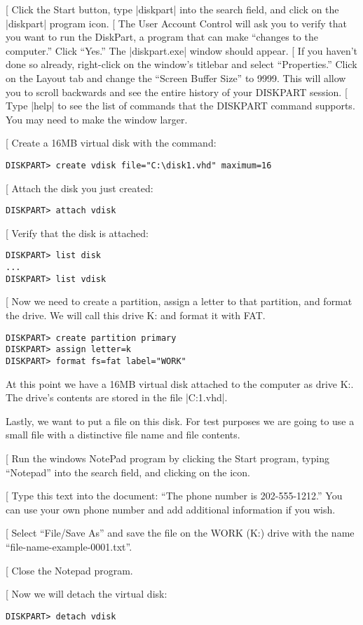 \documentclass[11pt,letter]{book}
\makeatletter
\def\step{%
   \@ifnextchar[ \@step{\@noitemargtrue\@step[\@itemlabel]}}
\def\@step[#1]{\item[#1]\mbox{}\hspace*{\dimexpr-\labelwidth-\labelsep}}
\makeatother
\begin{document}
\begin{steps}
\step Click the Start button, type |diskpart| into the search field,
and click on the |diskpart| program icon.
\step The User Account Control will ask you to verify that you want to
run the DiskPart, a program that can make ``changes to the computer.''
Click ``Yes.''  The |diskpart.exe| window should appear.
\step If you haven't done so already, right-click on the window's
titlebar and select ``Properties.'' Click on the Layout tab and change
the ``Screen Buffer Size'' to 9999. This will allow you to scroll
backwards and see the entire history of your DISKPART session.
\step Type |help| to see the list of commands that the DISKPART
command supports. You may need to make the window larger.

\step Create a 16MB virtual disk with the command:

\begin{Verbatim}
DISKPART> create vdisk file="C:\disk1.vhd" maximum=16
\end{Verbatim}

\step Attach the disk you just created:
\begin{Verbatim}
DISKPART> attach vdisk
\end{Verbatim}

\step Verify that the disk is attached:
\begin{Verbatim}
DISKPART> list disk
...
DISKPART> list vdisk
\end{Verbatim}

\step Now we need to create a partition, assign a letter to that
partition, and format the drive. We will call this drive K: and format
it with FAT. 
\begin{Verbatim}
DISKPART> create partition primary
DISKPART> assign letter=k
DISKPART> format fs=fat label="WORK"
\end{Verbatim}

At this point we have a 16MB virtual disk attached to the computer as
drive K:. The drive's contents are stored in the file |C:\disk1.vhd|.

Lastly, we want to put a file on this disk. For test purposes we are
going to use a small file with a distinctive file name and file
contents.

\step Run the windows NotePad program by clicking the Start program,
typing ``Notepad'' into the search field, and clicking on the icon.

\step Type this text into the document:  ``The phone number is
202-555-1212.'' You can use your own phone number and add additional
information if you wish.

\step Select ``File/Save As'' and save the file on the WORK (K:) drive
with the name ``file-name-example-0001.txt''. 

\step Close the Notepad program.

\step Now we will detach the virtual disk:

\begin{Verbatim}
DISKPART> detach vdisk
\end{Verbatim}
\end{steps}
\end{document}
